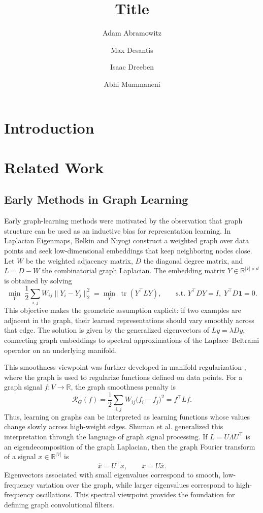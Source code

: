 \documentclass[11pt]{article}
\title{Title}
\author{Adam Abramowitz \and Max Desantis \and Isaac Dreeben \and Abhi Mummaneni}
\date{}
\begin{document}
\maketitle

\begin{abstract}
\end{abstract}

\section{Introduction}


\section{Related Work}


\subsection{Early Methods in Graph Learning}
Early graph-learning methods were motivated by the observation that graph structure can be used as an inductive bias for representation learning. In Laplacian Eigenmaps, Belkin and Niyogi \cite{belkin2001laplacian} construct a weighted graph over data points and seek low-dimensional embeddings that keep neighboring nodes close. Let $W$ be the weighted adjacency matrix, $D$ the diagonal degree matrix, and $L = D - W$ the combinatorial graph Laplacian. The embedding matrix $Y \in \mathbb{R}^{|V| \times d}$ is obtained by solving
\[
    \min_Y \; \frac{1}{2}\sum_{i,j} W_{ij}\|Y_i - Y_j\|_2^2
    = \min_Y \; \operatorname{tr}(Y^\top L Y),
    \qquad
    \text{s.t. } Y^\top D Y = I, \; Y^\top D\mathbf{1}=0.
\]
This objective makes the geometric assumption explicit: if two examples are adjacent in the graph, their learned representations should vary smoothly across that edge. The solution is given by the generalized eigenvectors of $L y = \lambda D y$, connecting graph embeddings to spectral approximations of the Laplace--Beltrami operator on an underlying manifold.

This smoothness viewpoint was further developed in manifold regularization \cite{belkin2006manifold}, where the graph is used to regularize functions defined on data points. For a graph signal $f : V \to \mathbb{R}$, the graph smoothness penalty is
\[
    \mathcal{R}_{G}(f)
    = \frac{1}{2}\sum_{i,j} W_{ij}\big(f_i - f_j\big)^2
    = f^\top L f.
\]
Thus, learning on graphs can be interpreted as learning functions whose values change slowly across high-weight edges. Shuman et al. \cite{shuman2013emerging} generalized this interpretation through the language of graph signal processing. If $L = U\Lambda U^\top$ is an eigendecomposition of the graph Laplacian, then the graph Fourier transform of a signal $x \in \mathbb{R}^{|V|}$ is
\[
    \widehat{x} = U^\top x,
    \qquad
    x = U\widehat{x}.
\]
Eigenvectors associated with small eigenvalues correspond to smooth, low-frequency variation over the graph, while larger eigenvalues correspond to high-frequency oscillations. This spectral viewpoint provides the foundation for defining graph convolutional filters.
\end{document}
